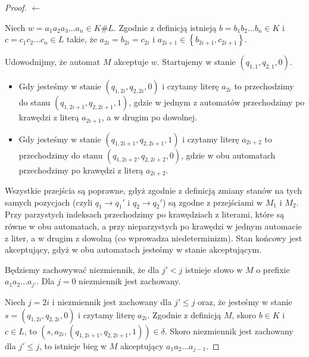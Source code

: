 \documentclass{article}
\theoremstyle{definition}
\theoremstyle{remark}
\begin{document}
\begin{proof}
    \(\leftarrow\)

    Niech \(w = a_1 a_2 a_3\ldots a_n \in K \# L\). Zgodnie z definicją istnieją \(b=b_1 b_2 \ldots b_n \in K\) i \(c=c_1 c_2 \ldots c_n \in L\) takie,
    że \(a_{2i} = b_{2i} = c_{2i}\) i \(a_{2i+1} \in \left\{ b_{2i+1}, c_{2i+1} \right\}\).
    
    Udowodnijmy, że automat \(M\) akceptuje \(w\). Startujemy w stanie \(\left(q_{1,1}, q_{2,1}, 0 \right)\).
    \begin{itemize}
        \item Gdy jesteśmy w stanie \(\left(q_{1,2i}, q_{2,2i}, 0 \right)\) i czytamy literę \(a_{2i}\)
        to przechodzimy do stanu \(\left(q_{1,2i+1}, q_{2,2i+1}, 1 \right)\),
        gdzie w jednym z automatów przechodzimy po krawędzi z literą \(a_{2i+1}\), a w drugim po dowolnej.
        \item Gdy jesteśmy w stanie \(\left(q_{1,2i+1}, q_{2,2i+1}, 1 \right)\) i czytamy literę \(a_{2i+2}\)
        to przechodzimy do stanu \(\left(q_{1,2i+2}, q_{2,2i+2}, 0 \right)\), gdzie w obu automatach przechodzimy po krawędzi z literą \(a_{2i+2}\).
    \end{itemize}

    Wszystkie przejścia są poprawne, gdyż zgodnie z definicją zmiany stanów na tych samych pozycjach (czyli \(q_1 \rightarrow q_1'\) i \(q_2 \rightarrow q_2'\))
    są zgodne z przejściami w \(M_1\) i \(M_2\).
    Przy parzystych indeksach przechodzimy po krawędziach z literami, które są równe w obu automatach,
    a przy nieparzystych po krawędzi w jednym automacie z liter, a w drugim z dowolną (co wprowadza niedeterminizm).
    Stan końcowy jest akceptujący, gdyż w obu automatach jesteśmy w stanie akceptującym.

    Będziemy zachowywać niezmiennik, że dla \(j' < j\) istnieje słowo w \(M\) o prefixie \(a_1 a_2 \ldots a_{j'}\). Dla \(j = 0\) niezmiennik jest zachowany.
    
    Niech \( j = 2i\) i niezmiennik jest zachowany dla \(j' \leq j\) oraz, że jesteśmy w stanie \(s = \left(q_{1,2i}, q_{2,2i}, 0 \right)\) i czytamy literę \(a_{2i}\).
    Zgodnie z definicją \(M\), skoro \(b \in K\) i \(c \in L\), to \( \left( s, a_{2i}, \left( q_{1,2i+1}, q_{2,2i+1}, 1 \right) \right) \in \delta\).
    Skoro niezmiennik jest zachowany dla \(j' \leq j\), to istnieje bieg w \(M\) akceptujący \(a_1 a_2 \ldots a_{j-1}\).


\end{proof}
\end{document}
